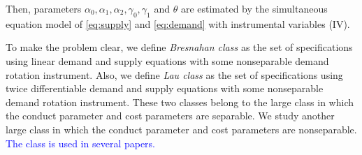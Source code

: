 \documentclass[11pt]{article}
\begin{document}
Then, parameters $\alpha_0,\alpha_1,\alpha_2,\gamma_0,\gamma_1$ and $\theta$ are estimated by the simultaneous equation model of \eqref{eq:supply} and \eqref{eq:demand} with instrumental variables (IV).

To make the problem clear, we define \textit{Bresnahan class} as the set of specifications using linear demand and supply equations with some nonseparable demand rotation instrument. Also, we define \textit{Lau class} as the set of specifications using twice differentiable demand and supply equations with some nonseparable demand rotation instrument. These two classes belong to the large class in which the conduct parameter and cost parameters are separable. We study another large class in which the conduct parameter and cost parameters are nonseparable. \textcolor{blue}{The class is used in several papers.}
\end{document}
